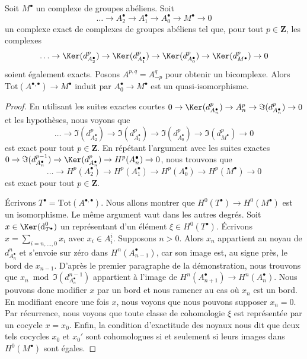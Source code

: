 \begin{lemma}
\label{lemma-good-resolution-gives-qis}
Soit $M^\bullet$ un complexe de groupes abéliens. Soit
$$
\ldots \to A_2^\bullet \to A_1^\bullet \to A_0^\bullet \to M^\bullet \to 0
$$
un complexe exact de complexes de groupes abéliens tel que, pour tout
$p \in \mathbf{Z}$, les complexes
$$
\ldots \to \Ker(d_{A_2^\bullet}^p) \to \Ker(d_{A_1^\bullet}^p)
\to \Ker(d_{A_0^\bullet}^p) \to \Ker(d_{M^\bullet}^p) \to 0
$$
soient également exacts. Posons $A^{p, q} = A_{-p}^q$ pour obtenir un
bicomplexe. Alors $\text{Tot}(A^{\bullet, \bullet}) \to M^\bullet$
induit par $A_0^\bullet \to M^\bullet$ est un quasi-isomorphisme.
\end{lemma}

\begin{proof}
En utilisant les suites exactes courtes
$0 \to \Ker(d^p_{A_n^\bullet}) \to A_n^p \to \Im(d^p_{A_n^\bullet}) \to 0$
et les hypothèses, nous voyons que
$$
\ldots \to \Im(d_{A_2^\bullet}^p) \to \Im(d_{A_1^\bullet}^p)
\to \Im(d_{A_0^\bullet}^p) \to \Im(d_{M^\bullet}^p) \to 0
$$
est exact pour tout $p \in \mathbf{Z}$. En répétant l'argument avec les
suites exactes
$0 \to \Im(d^{p - 1}_{A_n^\bullet}) \to \Ker(d^p_{A_n^\bullet})
\to H^p(A_n^\bullet) \to 0$, nous trouvons que
$$
\ldots \to H^p(A_2^\bullet) \to H^p(A_1^\bullet)
\to H^p(A_0^\bullet) \to H^p(M^\bullet) \to 0
$$
est exact pour tout $p \in \mathbf{Z}$.

\medskip\noindent
Écrivons $T^\bullet = \text{Tot}(A^{\bullet, \bullet})$. Nous allons montrer que
$H^0(T^\bullet) \to H^0(M^\bullet)$ est un isomorphisme. Le même argument
vaut dans les autres degrés. Soit $x \in \Ker(\text{d}_{T^\bullet}^0)$ un
représentant d'un élément $\xi \in H^0(T^\bullet)$.
Écrivons $x = \sum_{i = n, \ldots, 0} x_i$ avec $x_i \in A_i^i$.
Supposons $n > 0$. Alors $x_n$ appartient au noyau de
$d_{A_n^\bullet}^n$ et s'envoie sur zéro dans $H^n(A_{n - 1}^\bullet)$,
car son image est, au signe près, le bord de $x_{n - 1}$.
D'après le premier paragraphe de la démonstration, nous trouvons que
$x_n \bmod \Im(d^{n - 1}_{A_n^\bullet})$
appartient à l'image de $H^n(A_{n + 1}^\bullet) \to H^n(A_n^\bullet)$.
Nous pouvons donc modifier $x$ par un bord et nous ramener au cas où
$x_n$ est un bord. En modifiant encore une fois $x$, nous voyons que
nous pouvons supposer $x_n = 0$. Par récurrence, nous voyons que toute
classe de cohomologie $\xi$ est représentée par un cocycle $x = x_0$.
Enfin, la condition d'exactitude des noyaux nous dit que deux tels cocycles
$x_0$ et $x_0'$ sont cohomologues si et seulement si leurs images dans
$H^0(M^\bullet)$ sont égales.
\end{proof}

